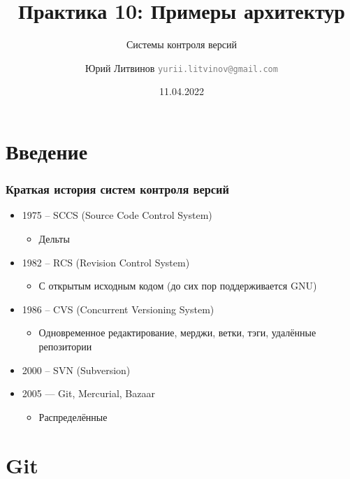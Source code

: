 \documentclass[xetex,mathserif,serif]{beamer}
\title{Практика 10: Примеры архитектур}
\subtitle{Системы контроля версий}
\author[Юрий Литвинов]{Юрий Литвинов \newline \textcolor{gray}{\small\texttt{yurii.litvinov@gmail.com}}}
\date{11.04.2022}
\begin{document}
    
\frame{\titlepage}

    \section{Введение}

    \begin{frame}
        \frametitle{Краткая история систем контроля версий}
        \begin{itemize}
            \item 1975 -- SCCS (Source Code Control System)
            \begin{itemize}
                \item Дельты
            \end{itemize}
            \item 1982 -- RCS (Revision Control System)
            \begin{itemize}
                \item С открытым исходным кодом (до сих пор поддерживается GNU)
            \end{itemize}
            \item 1986 -- CVS (Concurrent Versioning System)
            \begin{itemize}
                \item Одновременное редактирование, мерджи, ветки, тэги, удалённые репозитории
            \end{itemize}
            \item 2000 -- SVN (Subversion)
            \item 2005 --- Git, Mercurial, Bazaar
            \begin{itemize}
                \item Распределённые
            \end{itemize}
        \end{itemize}
    \end{frame}

    \section{Git}
\end{document}
